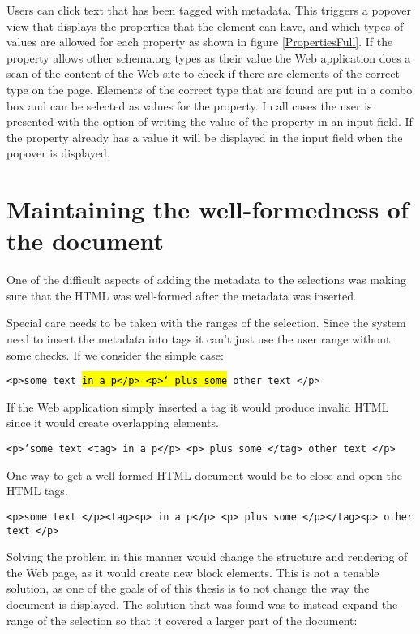 Users can click text that has been tagged with metadata.
This triggers a popover view that displays the properties that the element can have,
and which types of values are allowed for each property as shown in figure \ref{PropertiesFull}.
If the property allows other schema.org types as their value the Web application does a scan of the content of the Web site to check if
there are elements of the correct type on the page.
Elements of the correct type that are found are put in a combo box and can be selected as values for the property.
In all cases the user is presented with the option of writing the value of the property in an input field.
If the property already has a value it will be displayed in the input field when the popover is displayed.


\section{Maintaining the well-formedness of the document}
One of the difficult aspects of adding the metadata to the selections was making sure that the HTML was well-formed
after the metadata was inserted.

Special care needs to be taken with the ranges of the selection.
Since the system need to insert the metadata into tags it can't just use the user range without some checks.
If we consider the simple case:

\texttt{<p>some text \hl{in a p</p> <p>` plus some} other text </p>}

If the Web application simply inserted a tag it would produce invalid HTML since it would create overlapping elements.

\texttt{<p>`some text <tag> in a p</p> <p> plus some </tag>  other text </p>}

One way to get a well-formed HTML document would be to close and open the HTML tags.

\texttt{<p>some text </p><tag><p> in a p</p> <p> plus some </p></tag><p>  other text </p>}

Solving the problem in this manner would change the structure and rendering of the Web page,
as it would create new block elements.
This is not a tenable solution, as one of the goals of of this thesis is to not change the way the document is displayed.
The solution that was found was to instead expand the range of the selection so that it covered a larger part of the document:


